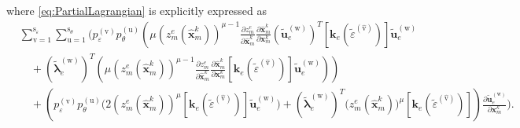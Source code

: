 where \eqref{eq:PartialLagrangian} is explicitly expressed as
\begin{equation}
\label{eq:PartialLagrangianExpand}
\begin{aligned}
& \sum_{\mathrm{v}=1}^{\mathrm{s}_{\varepsilon}} \sum_{\mathrm{u}=1}^{\mathrm{s}_{\theta}}\Bigg( p_{\varepsilon}^{(\mathrm{v})}p_{\theta}^{(\mathrm{u})} \left( \mu(z_m^e(\hat{\bm{x}}_m^{k}))^{\mu-1} \frac{\partial z_m^e}{\partial\hat{\bm x}_m^k} \frac{\partial\hat{\bm x}_m^k}{\partial\bm x_m^k}(\tilde{\bm u}^{(\mathrm{w})}_{e})^{T} [\bm{k}_e(\tilde\varepsilon^{(\hat{\mathrm{v}})})] \tilde{\bm u}_{e}^{(\mathrm{w})} \right.
\\
&\quad+(\tilde{\bm\lambda}_e^{(\mathrm{w})})^{T} \left. \left( \mu(z_m^e(\hat{\bm x}_m^k))^{\mu-1}\frac{\partial z_m^e}{\partial\hat{\bm x}_m^k}\frac{\partial\hat{\bm x}_m^k}{\partial\bm x_m^k} [\bm{k}_e(\tilde\varepsilon^{(\hat{\mathrm{v}})})] \tilde{\bm u}_e^{(\mathrm{w})} \right) \right)
\\
&\quad+\left( p_{\varepsilon}^{(\mathrm{v})}p_{\theta}^{(\mathrm{u})} \Big(2(z_m^e(\hat{\bm x}_m^k))^\mu [\bm k_e(\tilde\varepsilon^{(\hat{\mathrm{v}})})] \tilde{\bm u}_e^{(\mathrm{w})}\Big) + (\tilde{\bm\lambda}_e^{(\mathrm{w})})^{T}\bm (z_m^e(\hat{\bm x}_m^k))^\mu [\bm k_e(\tilde\varepsilon^{(\hat{\mathrm{v}})})] \right)\frac{\partial\tilde{\bm u}_e^{(\mathrm{w})}}{\partial\bm x_m^k} \Bigg).
\end{aligned}
\end{equation}

